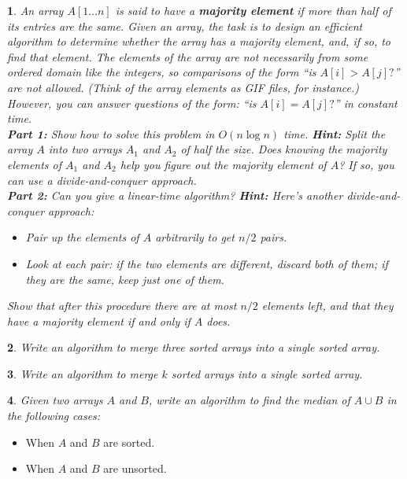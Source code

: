 \documentclass[%
addpoints]{exam}
\theoremstyle{problem}
\newtheorem{p}{}
\begin{document}
\begin{p}
An array \( A[1 \dots n] \) is said to have a \textbf{majority element} if more than half of its entries are the same. Given an array, the task is to design an efficient algorithm to determine whether the array has a majority element, and, if so, to find that element. The elements of the array are not necessarily from some ordered domain like the integers, so comparisons of the form “is \( A[i] > A[j]? \)” are not allowed. (Think of the array elements as GIF files, for instance.) However, you can answer questions of the form: “is \( A[i] = A[j]? \)” in constant time.\\
\vspace{10pt}
\textbf{Part 1:} Show how to solve this problem in \( O(n \log n) \) time. 
\textbf{Hint:} Split the array \( A \) into two arrays \( A_1 \) and \( A_2 \) of half the size. Does knowing the majority elements of \( A_1 \) and \( A_2 \) help you figure out the majority element of \( A \)? If so, you can use a \textit{divide-and-conquer} approach.\\
\vspace{10pt}
\textbf{Part 2:} Can you give a linear-time algorithm? 
\textbf{Hint:} Here’s another \textit{divide-and-conquer} approach:
\begin{itemize}
    \item Pair up the elements of \( A \) arbitrarily to get \( n/2 \) pairs.
    \item Look at each pair: if the two elements are different, discard both of them; if they are the same, keep just one of them.
\end{itemize}
Show that after this procedure there are at most \( n/2 \) elements left, and that they have a majority element if and only if \( A \) does.
\hfill \end{p}

\newpage


\begin{p}
Write an algorithm to merge three sorted arrays into a single sorted array.\\
\hfill \end{p}

\begin{p}
Write an algorithm to merge \( k \) sorted arrays into a single sorted array.\\
\hfill \end{p}

\begin{p}
Given two arrays \( A \) and \( B \), write an algorithm to find the median of \( A \cup B \) in the following cases:  
\hfill \end{p}
\begin{itemize}
    \item When \( A \) and \( B \) are sorted.
    \item When \( A \) and \( B \) are unsorted.
\end{itemize}
\end{document}
